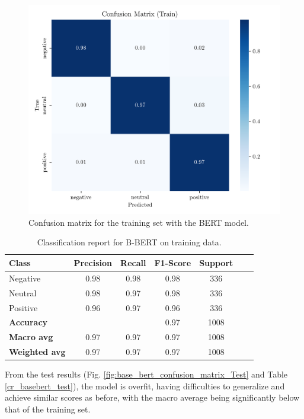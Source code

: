\documentclass[conference]{IEEEtran}
\begin{document}
\begin{figure}[H]
    \centering
    \includegraphics[width=1\linewidth]{assets/base_bert_confusion_matrix_Train.png}
    \caption{Confusion matrix for the training set with the BERT model.}
    \label{fig:base_bert_confusion_matrix_Train}
\end{figure}

\begin{table}[H]
\centering
\caption{Classification report for B-BERT on training data.}
\label{cr_basebert_train}
\begin{tabular}{lcccccc}
\toprule
\textbf{Class} & \textbf{Precision} & \textbf{Recall} & \textbf{F1-Score} & \textbf{Support} \\
\midrule
Negative & 0.98 & 0.98 & 0.98 & 336 \\
Neutral & 0.98 & 0.97 & 0.98 & 336 \\
Positive & 0.96 & 0.97 & 0.96 & 336 \\
\midrule
\textbf{Accuracy} &  &  & 0.97 & 1008 \\
\textbf{Macro avg} & 0.97 & 0.97 & 0.97 & 1008 \\
\textbf{Weighted avg} & 0.97 & 0.97 & 0.97 & 1008 \\
\bottomrule
\end{tabular}
\end{table}

From the test results (Fig. \ref{fig:base_bert_confusion_matrix_Test} and Table \ref{cr_basebert_test}), the model is overfit, having difficulties to generalize and achieve similar scores as before, with the macro average being significantly below that of the training set.
\end{document}
